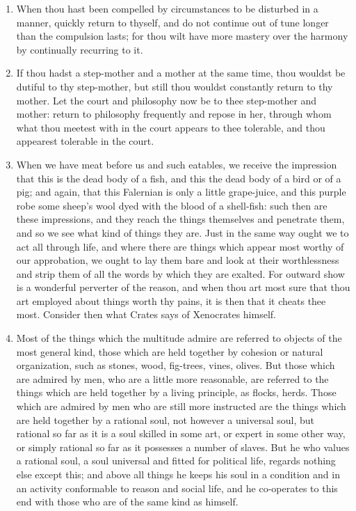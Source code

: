 \begin{enumerate}
\item When thou hast been compelled by circumstances to be disturbed in a manner, quickly return to thyself, and do not continue out of tune longer than the compulsion lasts; for thou wilt have more mastery over the harmony by continually recurring to it.

\item If thou hadst a step-mother and a mother at the same time, thou wouldst be dutiful to thy step-mother, but still thou wouldst constantly return to thy mother. Let the court and philosophy now be to thee step-mother and mother: return to philosophy frequently and repose in her, through whom what thou meetest with in the court appears to thee tolerable, and thou appearest tolerable in the court.

\item When we have meat before us and such eatables, we receive the impression that this is the dead body of a fish, and this the dead body of a bird or of a pig; and again, that this Falernian is only a little grape-juice, and this purple robe some sheep's wool dyed with the blood of a shell-fish: such then are these impressions, and they reach the things themselves and penetrate them, and so we see what kind of things they are. Just in the same way ought we to act all through life, and where there are things which appear most worthy of our approbation, we ought to lay them bare and look at their worthlessness and strip them of all the words by which they are exalted. For outward show is a wonderful perverter of the reason, and when thou art most sure that thou art employed about things worth thy pains, it is then that it cheats thee most. Consider then what Crates says of Xenocrates himself.

\item Most of the things which the multitude admire are referred to objects of the most general kind, those which are held together by cohesion or natural organization, such as stones, wood, fig-trees, vines, olives. But those which are admired by men, who are a little more reasonable, are referred to the things which are held together by a living principle, as flocks, herds. Those which are admired by men who are still more instructed are the things which are held together by a rational soul, not however a universal soul, but rational so far as it is a soul skilled in some art, or expert in some other way, or simply rational so far as it possesses a number of slaves. But he who values a rational soul, a soul universal and fitted for political life, regards nothing else except this; and above all things he keeps his soul in a condition and in an activity conformable to reason and social life, and he co-operates to this end with those who are of the same kind as himself.


\end{enumerate}
